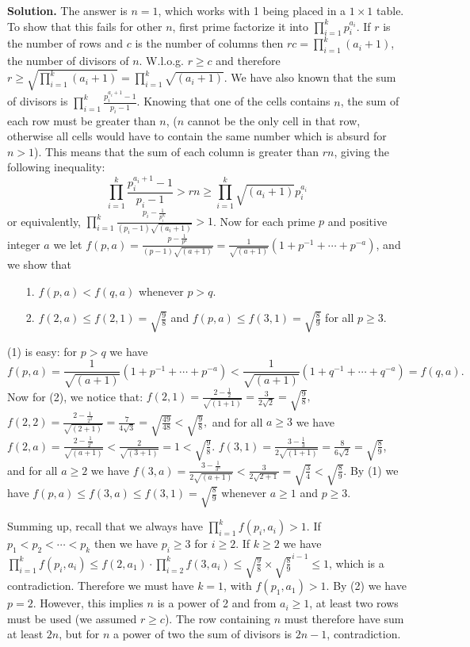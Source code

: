 \documentclass[11pt,a4paper]{article}
\begin{document}
\begin{itemize}
\textbf{Solution.} 
The answer is $n=1$, which works with 1 being placed in a $1\times 1$ table. 
To show that this fails for other $n$, first prime factorize it into 
$\displaystyle\prod_{i=1}^k p_i^{a_i}$. 
If $r$ is the number of rows and $c$ is the number of columns then $rc=\displaystyle\prod_{i=1}^k (a_i+1)$, 
the number of divisors of $n$. 
W.l.o.g. $r\ge c$ and therefore $r\ge\sqrt{\displaystyle\prod_{i=1}^k (a_i+1)}=\displaystyle\prod_{i=1}^k \sqrt{(a_i+1)}$. 
We have also known that the sum of divisors is 
$\displaystyle\prod_{i=1}^k \frac{p_i^{a_i+1}-1}{p_i-1}$. 
Knowing that one of the cells contains $n$, the sum of each row must be greater than $n$, 
($n$ cannot be the only cell in that row, otherwise all cells would have to contain the same number which is absurd for $n>1$). 
This means that the sum of each column is greater than $rn$, giving the following inequality: 
$$\displaystyle\prod_{i=1}^k \frac{p_i^{a_i+1}-1}{p_i-1}>rn\ge\displaystyle\prod_{i=1}^k \sqrt{(a_i+1)}p_i^{a_i}$$
or equivalently, 
$\displaystyle\prod_{i=1}^k \frac{p_i-\frac{1}{p_i^{a_i}}}{(p_i-1)\sqrt{(a_i+1)}}>1$. 
Now for each prime $p$ and positive integer $a$ we let $f(p, a)=\frac{p-\frac{1}{p^{a}}}{(p-1)\sqrt{(a+1)}}=\frac1{\sqrt{(a+1)}}\left(1+p^{-1}+\cdots +p^{-a}\right)$, and we show that 
\begin{itemize}
\item[1.] $f(p,a)<f(q, a)$ whenever $p>q$. 
\item[2.] $f(2,a)\le f(2,1)=\sqrt{\frac 98}$ and $f(p,a)\le f(3,1)=\sqrt{\frac 89}$ for all $p\ge 3$. 
\end{itemize} 

(1) is easy: for $p>q$ we have 
\[f(p,a)=\frac1{\sqrt{(a+1)}}\left(1+p^{-1}+\cdots +p^{-a}\right)<\frac1{\sqrt{(a+1)}}\left(1+q^{-1}+\cdots +q^{-a}\right)=f(q,a).\]
Now for (2), we notice that: 
$f(2, 1)=\frac{2-\frac{1}{2}}{\sqrt{(1+1)}}=\frac3{2\sqrt{2}}=\sqrt{\frac 98}, $
$f(2, 2)=\frac{2-\frac{1}{2^2}}{\sqrt{(2+1)}}=\frac7{4\sqrt{3}}=\sqrt{\frac {49}{48}}<\sqrt{\frac 98}, $
and for all $a\ge 3$ we have 
$f(2, a)=\frac{2-\frac{1}{2^a}}{\sqrt{(a+1)}}<\frac{2}{\sqrt{(3+1)}}=1<\sqrt{\frac 98}$. 
$f(3, 1)=\frac{3-\frac{1}{3}}{2\sqrt{(1+1)}}=\frac8{6\sqrt{2}}=\sqrt{\frac 89}$, 
and for all $a\ge 2$ we have 
$f(3, a)=\frac{3-\frac{1}{3^a}}{2\sqrt{(a+1)}}<\frac 3{2\sqrt{2+1}}=\sqrt{\frac 34}<\sqrt{\frac 89}$. 
By (1) we have $f(p,a)\le f(3, a)\le f(3, 1)=\sqrt{\frac 89}$ whenever $a\ge 1$ and $p\ge 3$. 

Summing up, recall that we always have $\displaystyle\prod_{i=1}^k f(p_i, a_i)> 1$. 
If $p_1<p_2<\cdots <p_k$ then we have $p_i\ge 3$ for $i\ge 2$. 
If $k\ge 2$ we have $\displaystyle\prod_{i=1}^k f(p_i, a_i)\le f(2, a_1)\cdot \displaystyle\prod_{i=2}^k f(3, a_i)\le\sqrt{\frac 98}\times \sqrt{\frac 89}^{i-1}\le 1$, 
which is a contradiction. 
Therefore we must have $k=1$, with $f(p_1, a_1)>1$. By (2) we have $p=2$. 
However, this implies $n$ is a power of 2 and from $a_i\ge 1$, at least two rows must be used (we assumed $r\ge c$). 
The row containing $n$ must therefore have sum at least $2n$, 
but for $n$ a power of two the sum of divisors is $2n-1$, contradiction. 


\end{itemize}
\end{document}
